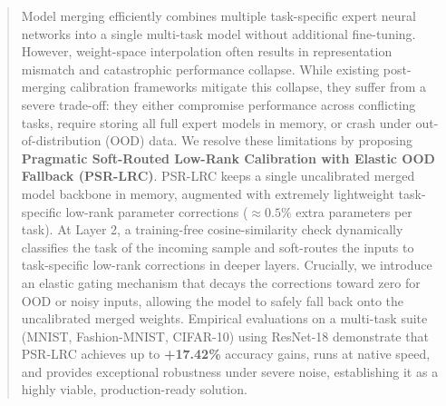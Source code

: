 \documentclass{article}
\theoremstyle{plain}
\theoremstyle{definition}
\theoremstyle{remark}
\begin{document}
\setlength{\textfloatsep}{9pt plus 2pt minus 2pt}
\setlength{\floatsep}{8pt plus 2pt minus 2pt}
\setlength{\intextsep}{8pt plus 2pt minus 2pt}
\setlength{\dbltextfloatsep}{9pt plus 2pt minus 2pt}
\setlength{\dblfloatsep}{8pt plus 2pt minus 2pt}


\printAffiliationsAndNotice{\icmlEqualContribution}

\begin{abstract}
Model merging efficiently combines multiple task-specific expert neural networks into a single multi-task model without additional fine-tuning. However, weight-space interpolation often results in representation mismatch and catastrophic performance collapse. While existing post-merging calibration frameworks mitigate this collapse, they suffer from a severe trade-off: they either compromise performance across conflicting tasks, require storing all full expert models in memory, or crash under out-of-distribution (OOD) data. We resolve these limitations by proposing \textbf{Pragmatic Soft-Routed Low-Rank Calibration with Elastic OOD Fallback (PSR-LRC)}. PSR-LRC keeps a single uncalibrated merged model backbone in memory, augmented with extremely lightweight task-specific low-rank parameter corrections ($\approx 0.5\%$ extra parameters per task). At Layer 2, a training-free cosine-similarity check dynamically classifies the task of the incoming sample and soft-routes the inputs to task-specific low-rank corrections in deeper layers. Crucially, we introduce an elastic gating mechanism that decays the corrections toward zero for OOD or noisy inputs, allowing the model to safely fall back onto the uncalibrated merged weights. Empirical evaluations on a multi-task suite (MNIST, Fashion-MNIST, CIFAR-10) using ResNet-18 demonstrate that PSR-LRC achieves up to \textbf{+17.42\%} accuracy gains, runs at native speed, and provides exceptional robustness under severe noise, establishing it as a highly viable, production-ready solution.
\end{abstract}
\end{document}
